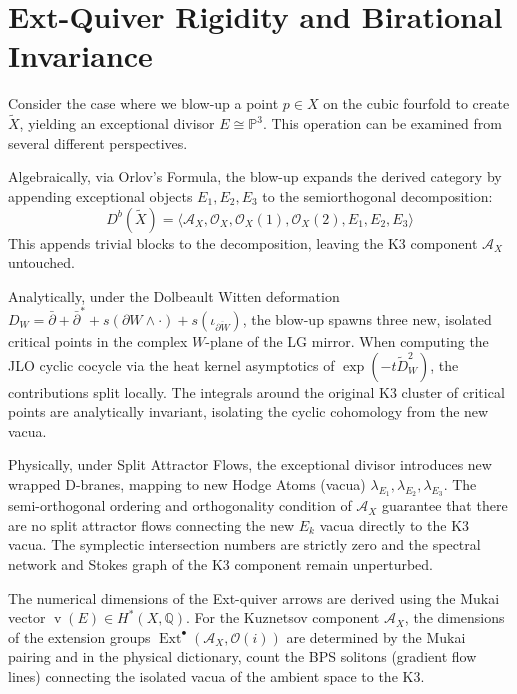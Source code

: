 \documentclass[12pt,reqno]{amsart}
\theoremstyle{remark} \newtheorem{remark}[theorem]{Remark}
\begin{document}
\section{Ext-Quiver Rigidity and Birational Invariance}

Consider the case where we blow-up a point $p \in X$ on the cubic
fourfold to create $\tilde{X}$, yielding an exceptional divisor $E
\cong \mathbb{P}^3$.  This operation can be examined from several
different perspectives.

Algebraically, via Orlov's Formula, the blow-up expands the
derived category by appending exceptional objects $E_1, E_2, E_3$ to
the semiorthogonal decomposition:
\begin{equation}
    D^b(\tilde{X}) = \langle \mathcal{A}_X, \mathcal{O}_X,
    \mathcal{O}_X(1), \mathcal{O}_X(2), E_1, E_2, E_3 \rangle
\end{equation}
This appends trivial blocks to the decomposition, leaving the K3
component $\mathcal{A}_X$ untouched.

Analytically, under the
Dolbeault Witten deformation $D_W = \bar{\partial} + \bar{\partial}^*
+ s(\partial W \wedge \cdot) + s(\iota_{\overline{\partial W}})$, the
blow-up spawns three new, isolated critical points in the complex
$W$-plane of the LG mirror. When computing the JLO cyclic cocycle via
the heat kernel asymptotics of $\exp(-t \tilde{D}_W^2)$, the
contributions split locally. The integrals around the original K3
cluster of critical points are analytically invariant, isolating the
cyclic cohomology from the new vacua.

Physically, under Split Attractor Flows, the exceptional divisor
introduces new wrapped D-branes, mapping to new Hodge Atoms (vacua)
$\lambda_{E_1}, \lambda_{E_2}, \lambda_{E_3}$. The semi-orthogonal
ordering and orthogonality condition of $\mathcal{A}_X$ guarantee that
there are no split attractor flows connecting the new $E_k$ vacua
directly to the K3 vacua. The symplectic intersection numbers are
strictly zero and the spectral network and Stokes graph of the K3
component remain unperturbed.

The numerical dimensions of the Ext-quiver arrows are derived using
the Mukai vector $\operatorname{v}(E) \in H^*(X, \mathbb{Q})$. For the
Kuznetsov component $\mathcal{A}_X$, the dimensions of the extension
groups $\operatorname{Ext}^\bullet(\mathcal{A}_X, \mathcal{O}(i))$ are
determined by the Mukai pairing and in the physical dictionary,
count the BPS solitons (gradient flow lines) connecting the
isolated vacua of the ambient space to the K3.
\end{document}
